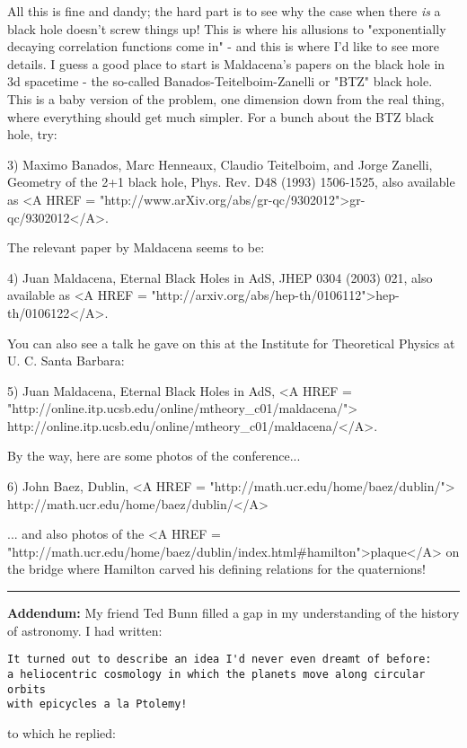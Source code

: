 All this is fine and dandy; the hard part is to see why the case when there 
\emph{is} a black hole doesn't screw things up!  This is where his allusions 
to "exponentially decaying correlation functions come in" - 
and this is 
where I'd like to see more details.  I guess a good place to start is
Maldacena's papers on the black hole in 3d spacetime - the so-called 
Banados-Teitelboim-Zanelli or "BTZ" black hole.  
This is a baby version 
of the problem, one dimension down from the real thing, where everything 
should get much simpler.  For a bunch about the BTZ black hole, try:

3) Maximo Banados, Marc Henneaux, Claudio Teitelboim, and Jorge Zanelli,
Geometry of the 2+1 black hole, 
Phys. Rev. D48 (1993) 1506-1525, also 
available as 
<A HREF = "http://www.arXiv.org/abs/gr-qc/9302012">gr-qc/9302012</A>.

The relevant paper by Maldacena seems to be:

4) Juan Maldacena, Eternal Black Holes in AdS,
JHEP 0304 (2003) 021, also 
available as 
<A HREF = "http://arxiv.org/abs/hep-th/0106112">hep-th/0106122</A>. 

You can also see a talk he gave on this
at the Institute for Theoretical Physics at U. C. Santa Barbara:

5) Juan Maldacena, Eternal Black Holes in AdS, 
<A HREF = "http://online.itp.ucsb.edu/online/mtheory_c01/maldacena/">
http://online.itp.ucsb.edu/online/mtheory_c01/maldacena/</A>.

By the way, here are some photos of the conference...

6) John Baez, Dublin, <A HREF = "http://math.ucr.edu/home/baez/dublin/">
http://math.ucr.edu/home/baez/dublin/</A>

... and also 
photos of the <A HREF = "http://math.ucr.edu/home/baez/dublin/index.html#hamilton">plaque</A> on the bridge where Hamilton carved his defining relations for 
the quaternions!
 
\par\noindent\rule{\textwidth}{0.4pt}
\textbf{Addendum:} My friend Ted Bunn filled a gap in my 
understanding of the history of astronomy.  I had written:

\begin{verbatim}
It turned out to describe an idea I'd never even dreamt of before: 
a heliocentric cosmology in which the planets move along circular orbits 
with epicycles a la Ptolemy!  
\end{verbatim}
    

to which he replied:

